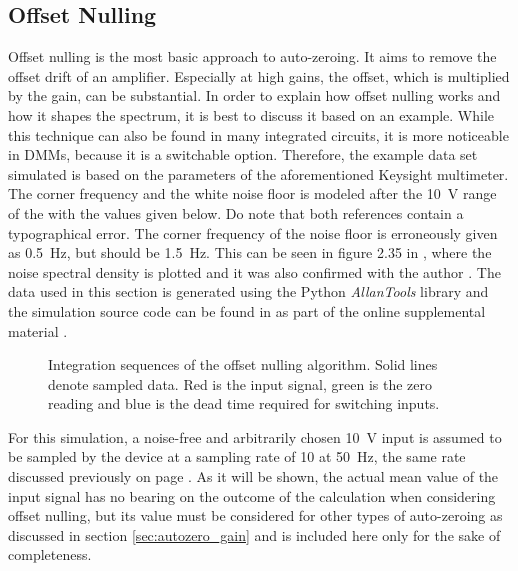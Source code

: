 \subsection{Offset Nulling}%
\label{sec:autozero_offset_nulling}
Offset nulling is the most basic approach to auto-zeroing. It aims to remove the offset drift of an amplifier. Especially at high gains, the offset, which is multiplied by the gain, can be substantial. In order to explain how offset nulling works and how it shapes the spectrum, it is best to discuss it based on an example. While this technique can also be found in many integrated circuits, it is more noticeable in DMMs, because it is a switchable option. Therefore, the example data set simulated is based on the parameters of the aforementioned Keysight  multimeter. The corner frequency and the white noise floor is modeled after the \qty{10}{\V} range of the  \cite{3458A_noise_floor, sampling_with_3458A} with the values given below. Do note that both references \cite{3458A_noise_floor, sampling_with_3458A} contain a typographical error. The corner frequency of the noise floor is erroneously given as \qty{0.5}{\Hz}, but should be \qty{1.5}{\Hz}. This can be seen in figure 2.35 in \citep[p. 116]{sampling_with_3458A}, where the noise spectral density is plotted and it was also confirmed with the author \cite{lapuh_email_corner_frequency}. The data used in this section is generated using the Python \textit{AllanTools} library \cite{allantools} and the simulation source code can be found in  as part of the online supplemental material \cite{supplemental_material}.

\begin{figure}[ht]
    \centering
    \caption{Integration sequences of the offset nulling algorithm. Solid lines denote sampled data. Red is the input signal, green is the zero reading and blue is the dead time required for switching inputs.}
    \label{fig:dmm_autozer_offset_nulling}
\end{figure}

For this simulation, a noise-free and arbitrarily chosen \qty{10}{\V} input is assumed to be sampled by the device at a sampling rate of \qty{10}{\plc} at \qty{50}{\Hz}, the same rate discussed previously on page \pageref{sec:dead_time}. As it will be shown, the actual mean value of the input signal has no bearing on the outcome of the calculation when considering offset nulling, but its value must be considered for other types of auto-zeroing as discussed in section \ref{sec:autozero_gain} and is included here only for the sake of completeness.

